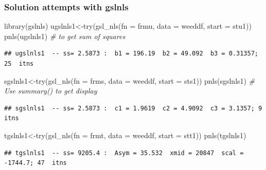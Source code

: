 \documentclass[
]{article}
\newenvironment{Shaded}{\begin{snugshade}}{\end{snugshade}}
\newcommand{\AttributeTok}[1]{\textcolor[rgb]{0.77,0.63,0.00}{#1}}
\newcommand{\CommentTok}[1]{\textcolor[rgb]{0.56,0.35,0.01}{\textit{#1}}}
\newcommand{\FunctionTok}[1]{\textcolor[rgb]{0.00,0.00,0.00}{#1}}
\newcommand{\NormalTok}[1]{#1}
\newcommand{\OtherTok}[1]{\textcolor[rgb]{0.56,0.35,0.01}{#1}}
\begin{document}
\hypertarget{solution-attempts-with-gslnls}{%
\subsubsection{Solution attempts with
gslnls}\label{solution-attempts-with-gslnls}}

\begin{Shaded}
\begin{Highlighting}[]
\FunctionTok{library}\NormalTok{(gslnls)}
\NormalTok{ugslnls1}\OtherTok{\textless{}{-}}\FunctionTok{try}\NormalTok{(}\FunctionTok{gsl\_nls}\NormalTok{(}\AttributeTok{fn =}\NormalTok{ frmu, }\AttributeTok{data =}\NormalTok{ weeddf,  }\AttributeTok{start =}\NormalTok{ stu1))}
\FunctionTok{pnls}\NormalTok{(ugslnls1) }\CommentTok{\# to get sum of squares}
\end{Highlighting}
\end{Shaded}

\begin{verbatim}
## ugslnls1  -- ss= 2.5873 :  b1 = 196.19  b2 = 49.092  b3 = 0.31357; 25  itns
\end{verbatim}

\begin{Shaded}
\begin{Highlighting}[]
\NormalTok{sgslnls1}\OtherTok{\textless{}{-}}\FunctionTok{try}\NormalTok{(}\FunctionTok{gsl\_nls}\NormalTok{(}\AttributeTok{fn =}\NormalTok{ frms, }\AttributeTok{data =}\NormalTok{ weeddf,  }\AttributeTok{start =}\NormalTok{ sts1))}
\FunctionTok{pnls}\NormalTok{(sgslnls1) }\CommentTok{\# Use summary() to get display}
\end{Highlighting}
\end{Shaded}

\begin{verbatim}
## sgslnls1  -- ss= 2.5873 :  c1 = 1.9619  c2 = 4.9092  c3 = 3.1357; 9  itns
\end{verbatim}

\begin{Shaded}
\begin{Highlighting}[]
\NormalTok{tgslnls1}\OtherTok{\textless{}{-}}\FunctionTok{try}\NormalTok{(}\FunctionTok{gsl\_nls}\NormalTok{(}\AttributeTok{fn =}\NormalTok{ frmt, }\AttributeTok{data =}\NormalTok{ weeddf,  }\AttributeTok{start =}\NormalTok{ stt1))}
\FunctionTok{pnls}\NormalTok{(tgslnls1) }
\end{Highlighting}
\end{Shaded}

\begin{verbatim}
## tgslnls1  -- ss= 9205.4 :  Asym = 35.532  xmid = 20847  scal = -1744.7; 47  itns
\end{verbatim}
\end{document}
